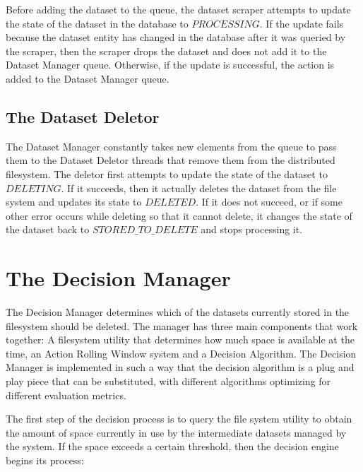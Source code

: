 Before adding the dataset to the queue, the dataset scraper attempts to update the state of the dataset in the database to $PROCESSING$. If the update fails because the dataset entity has changed in the database after it was queried by the scraper, then the scraper drops the dataset and does not add it to the Dataset Manager queue. Otherwise, if the update is successful, the action is added to the Dataset Manager queue.

\subsection{The Dataset Deletor}
The Dataset Manager constantly takes new elements from the queue to pass them to the Dataset Deletor threads that remove them from the distributed filesystem. The deletor first attempts to update the state of the dataset to $DELETING$. If it succeeds, then it actually deletes the dataset from the file system and updates its state to $DELETED$. If it does not succeed, or if some other error occurs while deleting so that it cannot delete, it changes the state of the dataset back to $STORED\_TO\_DELETE$ and stops processing it.

\section{The Decision Manager}
The Decision Manager determines which of the datasets currently stored in the filesystem should be deleted. The manager has three main components that work together: A filesystem utility that determines how much space is available at the time, an Action Rolling Window system and a Decision Algorithm. The Decision Manager is implemented in such a way that the decision algorithm is a plug and play piece that can be substituted, with different algorithms optimizing for different evaluation metrics.

The first step of the decision process is to query the file system utility to obtain the amount of space currently in use by the intermediate datasets managed by the system. If the space exceeds a certain threshold, then the decision engine begins its process:

